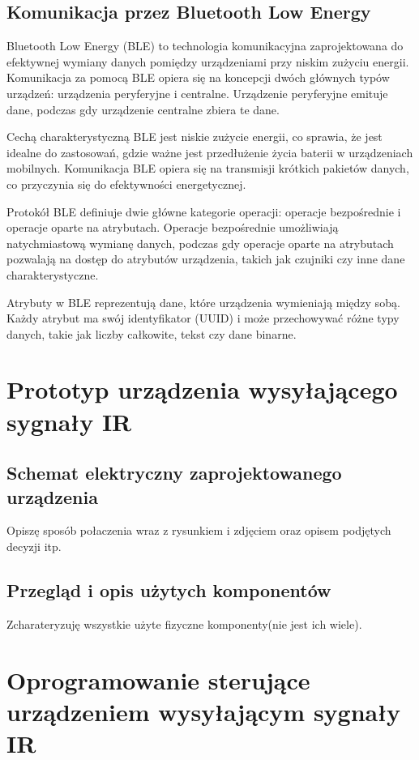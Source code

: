 \documentclass[12pt,twoside]{article}
\begin{document}
\subsection{Komunikacja przez Bluetooth Low Energy}
{Bluetooth Low Energy (BLE) to technologia komunikacyjna zaprojektowana do efektywnej wymiany danych pomiędzy urządzeniami przy niskim zużyciu energii.
Komunikacja za pomocą BLE opiera się na koncepcji dwóch głównych typów urządzeń: urządzenia peryferyjne i centralne. 
Urządzenie peryferyjne emituje dane, podczas gdy urządzenie centralne zbiera te dane.

Cechą charakterystyczną BLE jest niskie zużycie energii, co sprawia, że jest idealne do zastosowań, gdzie ważne jest przedłużenie życia baterii w urządzeniach mobilnych.
 Komunikacja BLE opiera się na transmisji krótkich pakietów danych, co przyczynia się do efektywności energetycznej.

Protokół BLE definiuje dwie główne kategorie operacji: operacje bezpośrednie i operacje oparte na atrybutach.
 Operacje bezpośrednie umożliwiają natychmiastową wymianę danych, podczas gdy operacje oparte na atrybutach 
pozwalają na dostęp do atrybutów urządzenia, takich jak czujniki czy inne dane charakterystyczne.

Atrybuty w BLE reprezentują dane, które urządzenia wymieniają między sobą. Każdy atrybut ma swój identyfikator 
(UUID) i może przechowywać różne typy danych, takie jak liczby całkowite, tekst czy dane binarne.}

\clearpage	

\section{Prototyp urządzenia wysyłającego sygnały IR}
\subsection{Schemat elektryczny zaprojektowanego urządzenia}
Opiszę sposób połaczenia wraz z rysunkiem i zdjęciem oraz opisem podjętych decyzji itp.
\subsection{Przegląd i opis użytych komponentów}
Zcharateryzuję wszystkie użyte fizyczne komponenty(nie jest ich wiele).
\clearpage

\section{Oprogramowanie sterujące urządzeniem wysyłającym sygnały IR}
\end{document}
